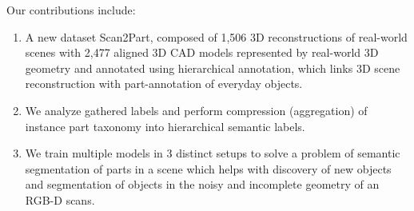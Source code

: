 
%

Our contributions include: 
\begin{enumerate}
\item A new dataset Scan2Part, composed of 1,506 3D reconstructions of real-world scenes with 2,477 aligned 3D CAD models represented by real-world 3D geometry and annotated using hierarchical annotation, which links 3D scene reconstruction with part-annotation of everyday objects.
\item We analyze gathered labels and perform compression (aggregation) of instance part taxonomy into hierarchical semantic labels. %
\item We train multiple models in 3 distinct setups to solve a problem of semantic segmentation of parts in a scene which helps with discovery of new objects and segmentation of objects in the noisy and incomplete geometry of an RGB-D scans. 
\end{enumerate}





